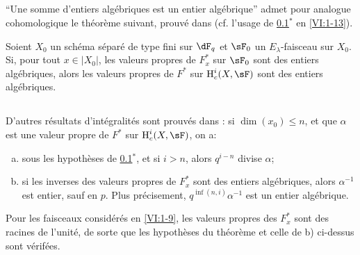 \subsection{}\label{VI:2-1}

``Une somme d'entiers alg\'ebriques est un entier alg\'ebrique'' admet pour 
analogue cohomologique le th\'eor\`eme suivant, prouv\'e dans 
\cite[XXI 5.2.2]{sga7} (cf. l'usage de \ref{VI:2-1}$^\ast$ en 
\ref{VI:1-13}). 





\begin{theorem*}[2.1*]\label{VI:2-1*}
Soient $X_0$ un sch\'ema s\'epar\'e de type fini sur $\dF_q$ et $\sF_0$ un 
$E_\lambda$-faisceau sur $X_0$. Si, pour tout $x\in |X_0|$, les valeurs 
propres de $F_x^\ast$ sur $\sF_0$ sont des entiers alg\'ebriques, alors les 
valeurs propres de $F^\ast$ sur $\h_c^i(X,\sF)$ sont des entiers alg\'ebriques. 
\end{theorem*}





\subsection{}\label{VI:2-2}

D'autres r\'esultats d'int\'egralit\'es sont prouv\'es dans 
\cite[XXI, 5.2.2 et 5.4]{sga7}: si $\dim(x_0)\leqslant n$, et que $\alpha$ est 
une valeur propre de $F^\ast$ sur $\h_c^i(X,\sF)$, on a: 
\begin{enumerate}[a)]
  \item sous les hypoth\`eses de \ref{VI:2-1}$^\ast$, et si $i>n$, alors 
    $q^{i-n}$ divise $\alpha$;
  \item si les inverses des valeurs propres de $F_x^\ast$ sont des entiers 
    alg\'ebriques, alors $\alpha^{-1}$ est entier, sauf en $p$. Plus 
    pr\'ecisement, $q^{\inf(n,i)}\alpha^{-1}$ est un entier alg\'ebrique. 
\end{enumerate}

Pour les faisceaux consid\'er\'es en \ref{VI:1-9}, les valeurs propres des 
$F_x^\ast$ sont des racines de l'unit\'e, de sorte que les hypoth\`eses du 
th\'eor\`eme et celle de b) ci-dessus sont v\'erif\'ees. 





\subsection{}\label{VI:2-3}

